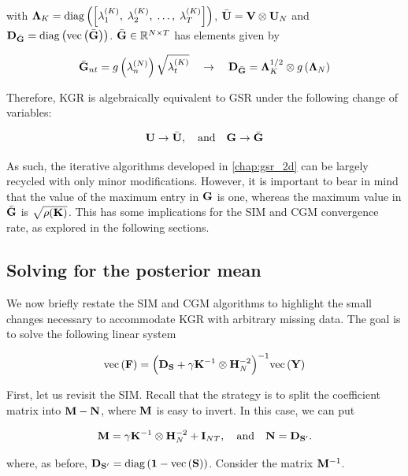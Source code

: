 with $\mathbf{\Lambda}_K = \text{\textup{diag}}\left(\left[\lambda^{(K)}_1, \; \lambda^{(K)}_2, \; \dots, \;\lambda^{(K)}_T \right]\right)$, $\bar{\mathbf{U}} = \mathbf{V} \otimes \mathbf{U}_N$ and $\mathbf{D}_{\bar{\mathbf{G}}} = \text{\textup{diag}}\left(\text{\textup{vec}}\left(\bar{\mathbf{G}}\right)\right)$. $\bar{\mathbf{G}} \in \mathbb{R}^{N \times T}$ has elements given by

\begin{equation}
    \bar{\mathbf{G}}_{nt} = g\left(\lambda^{(N)}_n\right) \sqrt{\lambda^{(K)}_t} \quad \rightarrow \quad \mathbf{D}_{\bar{\mathbf{G}}} = \mathbf{\Lambda}_K^{1/2} \otimes g\left(\mathbf{\Lambda}_N\right) 
\end{equation}



Therefore, KGR is algebraically equivalent to GSR under the following change of variables:

$$
\mathbf{U} \rightarrow \bar{\mathbf{U}}, \quad \text{and} \quad \mathbf{G} \rightarrow \bar{\mathbf{G}}
$$

As such, the iterative algorithms developed in \cref{chap:gsr_2d} can be largely recycled with only minor modifications. However, it is important to bear in mind that the value of the maximum entry in $\mathbf{G}$ is one, whereas the maximum value in $\bar{\mathbf{G}}$ is $\sqrt{\rho(\mathbf{K})}$. This has some implications for the SIM and CGM convergence rate, as explored in the following sections. 


 

\subsection{Solving for the posterior mean}

We now briefly restate the SIM and CGM algorithms to highlight the small changes necessary to accommodate KGR with arbitrary missing data. The goal is to solve the following linear system 

\begin{equation}
    \label{eq:lin_system_kgr}
    \text{\textup{vec}}\left(\mathbf{F}\right) = \Big(\mathbf{D}_{\mathbf{S}} + \gamma \mathbf{K}^{-1} \otimes \mathbf{H}_N^{-2}\Big)^{-1} \text{\textup{vec}}\left(\mathbf{Y}\right)
\end{equation}

First, let us revisit the SIM. Recall that the strategy is to split the coefficient matrix into $\mathbf{M} - \mathbf{N}$, where $\mathbf{M}$ is easy to invert. In this case, we can put

\begin{equation}
    \mathbf{M} = \gamma \mathbf{K}^{-1} \otimes \mathbf{H}_N^{-2} + \mathbf{I}_{NT}, \quad \text{and} \quad \mathbf{N} = \mathbf{D}_{\mathbf{S}'}.
\end{equation}

where, as before, $\mathbf{D}_{\mathbf{S}'} = \text{\textup{diag}}\left(\mathbf{1} - \text{\textup{vec}}\left(\mathbf{S}\right)\right)$. Consider the matrix $\mathbf{M}^{-1}$.

